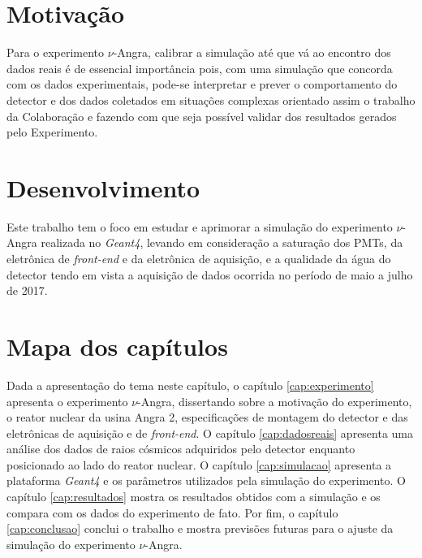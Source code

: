 \section{Motivação} 

Para o experimento $\nu$-Angra, calibrar a simulação até que vá ao encontro dos dados reais é de essencial importância pois, com uma simulação que concorda com os dados experimentais, pode-se interpretar e prever o comportamento do detector e dos dados coletados em situações complexas orientado assim o trabalho da Colaboração e fazendo com que seja possível validar dos resultados gerados pelo Experimento. 

\section{Desenvolvimento}

Este trabalho tem o foco em estudar e aprimorar a simulação do experimento $\nu$-Angra realizada no \emph{Geant4}, levando em consideração a saturação dos \ac{PMTs}, da eletrônica de \emph{front-end} e da eletrônica de aquisição, e a qualidade da água do detector tendo em vista a aquisição de dados ocorrida no período de maio a julho de 2017.

\section{Mapa dos capítulos}

Dada a apresentação do tema neste capítulo, o capítulo \ref{cap:experimento} apresenta o experimento $\nu$-Angra, dissertando sobre a motivação do experimento, o reator nuclear da usina Angra 2, especificações de montagem do detector e das eletrônicas de aquisição e de \emph{front-end}. O capítulo \ref{cap:dadosreais} apresenta uma análise dos dados de raios cósmicos adquiridos pelo detector enquanto posicionado ao lado do reator nuclear. O capítulo \ref{cap:simulacao} apresenta a plataforma \emph{Geant4} e os parâmetros utilizados pela simulação do experimento. O capítulo \ref{cap:resultados} mostra os resultados obtidos com a simulação e os compara com os dados do experimento de fato. Por fim, o capítulo \ref{cap:conclusao} conclui o trabalho e mostra previsões futuras para o ajuste da simulação do experimento $\nu$-Angra.